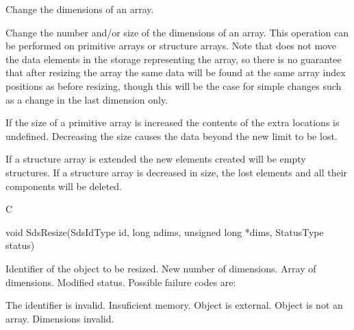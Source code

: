 \begin{manroutinedescription}
      Change the dimensions of an array.

     Change the number and/or size of the dimensions of an array. This
     operation can be performed on primitive arrays or structure arrays.
     Note that {} does not move the data elements in the %
storage
     representing the array, so there is no guarantee that after resizing
     the array the same data will be found at the same array index
     positions as before resizing, though this will be the case for
     simple changes such as a change in the last dimension only.

     If the size of a primitive array is increased the contents of the
     extra locations is undefined. Decreasing the size causes the data
     beyond the new limit to be lost.

     If a structure array is extended the new elements created will be empty
     structures. If a structure array is decreased in size, the lost elements
     and all their components will be deleted.

      C

      void SdsResize(SdsIdType id, long ndims, unsigned long *dims,
              StatusType {\mantt{*}} {} status)
 
\begin{manparametertable}
 Identifier of the object to be %
resized.
  New number of dimensions.
 Array of dimensions.
 Modified status. Possible %
failure codes are:
\end{manparametertable}
\begin{mantwocolumntable}
The identifier is invalid.
Insuficient memory.
Object is external.
Object is not an array.
Dimensions invalid.
\end{mantwocolumntable}
\end{manroutinedescription}
